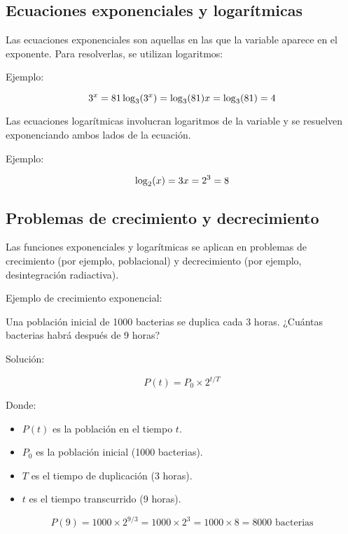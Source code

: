     \subsection{Ecuaciones exponenciales y logarítmicas}
    
    Las ecuaciones exponenciales son aquellas en las que la variable aparece en el exponente. Para resolverlas, se utilizan logaritmos:
    
    Ejemplo:
    
    \[
    3^x = 81 \\
    \log_3(3^x) = \log_3(81) \\
    x = \log_3(81) = 4
    \]
    
    Las ecuaciones logarítmicas involucran logaritmos de la variable y se resuelven exponenciando ambos lados de la ecuación.
    
    Ejemplo:
    
    \[
    \log_2(x) = 3 \\
    x = 2^3 = 8
    \]
    
    \subsection{Problemas de crecimiento y decrecimiento}
    
    Las funciones exponenciales y logarítmicas se aplican en problemas de crecimiento (por ejemplo, poblacional) y decrecimiento (por ejemplo, desintegración radiactiva).
    
    Ejemplo de crecimiento exponencial:
    
    Una población inicial de 1000 bacterias se duplica cada 3 horas. ¿Cuántas bacterias habrá después de 9 horas?
    
    Solución:
    
    \[
    P(t) = P_0 \times 2^{t/T}
    \]
    
    Donde:
    \begin{itemize}
        \item \( P(t) \) es la población en el tiempo \( t \).
        \item \( P_0 \) es la población inicial (1000 bacterias).
        \item \( T \) es el tiempo de duplicación (3 horas).
        \item \( t \) es el tiempo transcurrido (9 horas).
        
    \end{itemize}
    \[
    P(9) = 1000 \times 2^{9/3} = 1000 \times 2^3 = 1000 \times 8 = 8000 \text{ bacterias}
    \]